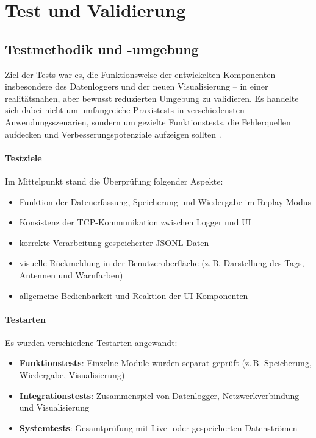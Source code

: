 \documentclass[a4paper, 12pt]{article} %
\begin{document}
\section{Test und Validierung}
\subsection{Testmethodik und -umgebung}

Ziel der Tests war es, die Funktionsweise der entwickelten Komponenten -- insbesondere des Datenloggers und der neuen Visualisierung -- in einer 
realitätsnahen, aber bewusst reduzierten Umgebung zu validieren. Es handelte sich dabei nicht um umfangreiche Praxistests in verschiedensten 
Anwendungsszenarien, sondern um gezielte Funktionstests, die Fehlerquellen aufdecken und Verbesserungspotenziale aufzeigen sollten \cite{myers_testing}.

\paragraph{Testziele}
Im Mittelpunkt stand die Überprüfung folgender Aspekte:
\begin{itemize}
    \item Funktion der Datenerfassung, Speicherung und Wiedergabe im Replay-Modus
    \item Konsistenz der \ac{TCP}-Kommunikation zwischen Logger und \ac{UI}
    \item korrekte Verarbeitung gespeicherter \ac{JSONL}-Daten \cite{json_processing_books}
    \item visuelle Rückmeldung in der Benutzeroberfläche (z.\,B. Darstellung des Tags, Antennen und Warnfarben)
    \item allgemeine Bedienbarkeit und Reaktion der UI-Komponenten \cite{nielsen_usability}
\end{itemize}

\paragraph{Testarten}
Es wurden verschiedene Testarten angewandt:
\begin{itemize}
    \item \textbf{Funktionstests}: Einzelne Module wurden separat geprüft (z.\,B. Speicherung, Wiedergabe, Visualisierung)
    \item \textbf{Integrationstests}: Zusammenspiel von Datenlogger, Netzwerkverbindung und Visualisierung
    \item \textbf{Systemtests}: Gesamtprüfung mit Live- oder gespeicherten Datenströmen
\end{itemize}
\end{document}
